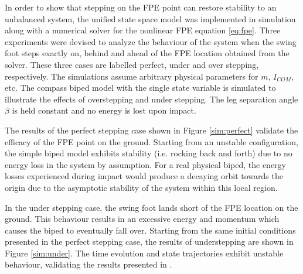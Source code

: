 In order to show that stepping on the FPE point can restore stability to an unbalanced system, the unified state space model was implemented in simulation along with a numerical solver for the nonlinear FPE equation \eqref{eq:fpe}. Three experiments were devised to analyze the behaviour of the system when the swing foot steps exactly on, behind and ahead of the FPE location obtained from the solver. These three cases are labelled perfect, under and over stepping, respectively. The simulations assume arbitrary physical parameters for $m$, $I_{COM}$, etc. The compass biped model with the single state variable is simulated to illustrate the effects of overstepping and under stepping. The leg separation angle $\beta$ is held constant and no energy is lost upon impact. 

The results of the perfect stepping case shown in Figure \ref{sim:perfect} validate the efficacy of the FPE point on the ground. Starting from an unstable configuration, the simple biped model exhibits stability (i.e. rocking back and forth) due to no energy loss in the system by assumption. For a real physical biped, the energy losses experienced during impact would produce a decaying orbit towards the origin due to the asymptotic stability of the system within this local region. 

In the under stepping case, the swing foot lands short of the FPE location on the ground. This behaviour results in an excessive energy and momentum which causes the biped to eventually fall over. Starting from the same initial conditions presented in the perfect stepping case, the results of understepping are shown in Figure \ref{sim:under}. The time evolution and state trajectories exhibit unstable behaviour,  validating the results presented in \cite{Wight:2008ii}. 

